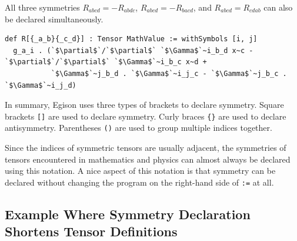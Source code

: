 All three symmetries $R_{abcd} = -R_{abdc}$, $R_{abcd} = -R_{bacd}$, and $R_{abcd} = R_{cdab}$ can also be declared simultaneously.
\begin{lstlisting}[language=egison,numbers=none]
def R[{_a_b}{_c_d}] : Tensor MathValue := withSymbols [i, j]
  g_a_i . (`$\partial$`/`$\partial$` `$\Gamma$`~i_b_d x~c - `$\partial$`/`$\partial$` `$\Gamma$`~i_b_c x~d +
           `$\Gamma$`~j_b_d . `$\Gamma$`~i_j_c - `$\Gamma$`~j_b_c . `$\Gamma$`~i_j_d)
\end{lstlisting}

In summary, Egison uses three types of brackets to declare symmetry.
Square brackets \lstinline|[]| are used to declare symmetry.
Curly braces \lstinline|{}| are used to declare antisymmetry.
Parentheses \lstinline|()| are used to group multiple indices together.

Since the indices of symmetric tensors are usually adjacent, the symmetries of tensors encountered in mathematics and physics can almost always be declared using this notation.
A nice aspect of this notation is that symmetry can be declared without changing the program on the right-hand side of \lstinline{:=} at all.


\subsection{Example Where Symmetry Declaration Shortens Tensor Definitions}

